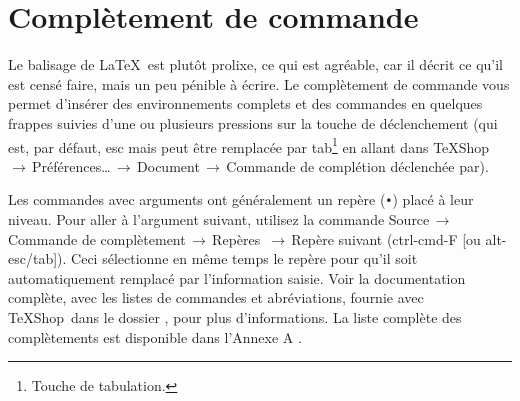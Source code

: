 \documentclass[11pt,french]{article}
\newcommand{\TS}{\textsf{\TeX Shop}}
\newcommand{\cmd}[1]{\textsf{#1}}
\newcommand{\mnu}[1]{\textsf{#1}}
\newcommand{\To}{\,\(\to\)\,}
\begin{document}




\section{Complètement de commande}\label{secCC}

Le balisage de \LaTeX\ est plutôt prolixe, ce qui est agréable, car il décrit ce qu'il est censé faire, mais un peu pénible à écrire. Le complètement de commande vous permet d'insérer des environnements complets et des commandes en quelques frappes suivies d'une ou plusieurs pressions  sur la touche de déclenchement (qui est, par défaut, \cmd{esc} mais peut être remplacée par \cmd{tab}\footnote{Touche de tabulation.} en allant dans \mnu{TeXShop}\To\mnu{Préférences…}\To\mnu{Document}\To\mnu{Commande de complétion déclenchée par}).

Les commandes avec arguments ont généralement un repère (\texttt{•}) placé à leur niveau. Pour aller à l'argument suivant, utilisez la commande \mnu{Source}\To\mnu{Commande de complètement}\To\mnu{Repères} \To\mnu{Repère suivant} (\cmd{ctrl-cmd-F} [ou \cmd{alt-esc/tab}]). Ceci sélectionne en même temps le repère pour qu'il soit automatiquement remplacé par l'information saisie. Voir la documentation complète, avec les listes de commandes et abréviations, fournie avec \TS\ dans le dossier , pour plus d'informations. La liste complète des complètements est disponible dans l'\cmd{Annexe A} .

\end{document}
